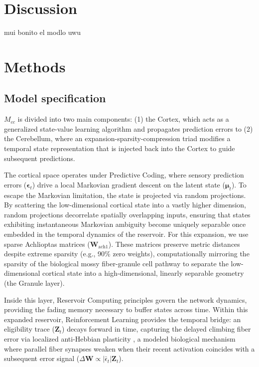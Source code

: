 \documentclass[12pt, a4paper]{extarticle}
\begin{document}
\section{Discussion}

mui bonito el modlo uwu
	
\section{Methods}
\label{sec:methods}

\subsection{Model specification}
$M_{cc}$ is divided into two main components: (1) the Cortex, which acts as a generalized state-value learning algorithm and propagates prediction errors to (2) the Cerebellum, where an expansion-sparsity-compression triad modifies a temporal state representation that is injected back into the Cortex to guide subsequent predictions.

The cortical space operates under Predictive Coding, where sensory prediction errors ($\boldsymbol{\epsilon}_t$) drive a local Markovian gradient descent on the latent state ($\boldsymbol{\mu}_t$). To escape the Markovian limitation, the state is projected via random projections. By scattering the low-dimensional cortical state into a vastly higher dimension, random projections decorrelate spatially overlapping inputs, ensuring that states exhibiting instantaneous Markovian ambiguity become uniquely separable once embedded in the temporal dynamics of the reservoir. For this expansion, we use sparse Achlioptas matrices \parencite{achlioptasDatabasefriendlyRandomProjections2003} ($\mathbf{W}_{\mathrm{ach1}}$). These matrices preserve metric distances despite extreme sparsity (e.g., 90\% zero weights), computationally mirroring the sparsity of the biological mossy fiber-granule cell pathway to separate the low-dimensional cortical state into a high-dimensional, linearly separable geometry (the Granule layer). 

Inside this layer, Reservoir Computing principles govern the network dynamics, providing the fading memory necessary to buffer states across time. Within this expanded reservoir, Reinforcement Learning \parencite{suttonReinforcementLearningIntroduction2018} provides the temporal bridge: an eligibility trace ($\mathbf{Z}_t$) decays forward in time, capturing the delayed climbing fiber error via localized anti-Hebbian plasticity \parencite{itoCerebellarLongtermDepression2001}, a modeled biological mechanism where parallel fiber synapses weaken when their recent activation coincides with a subsequent error signal ($\Delta \mathbf{W} \propto |\bar{\epsilon}_t| \mathbf{Z}_t$). 
\end{document}
